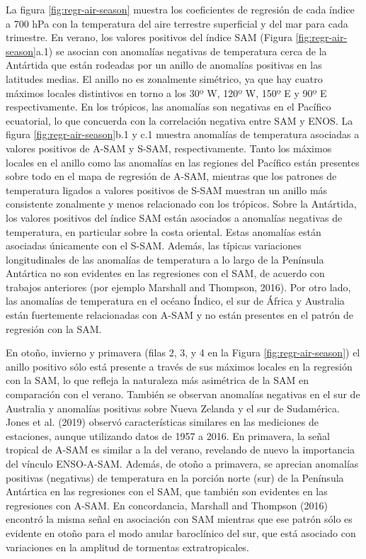 \documentclass[12pt,oneside]{reedthesis}
\begin{document}
La figura \ref{fig:regr-air-season} muestra los coeficientes de regresión de cada índice a 700 hPa con la temperatura del aire terrestre superficial y del mar para cada trimestre.
En verano, los valores positivos del índice SAM (Figura \ref{fig:regr-air-season}a.1) se asocian con anomalías negativas de temperatura cerca de la Antártida que están rodeadas por un anillo de anomalías positivas en las latitudes medias.
El anillo no es zonalmente simétrico, ya que hay cuatro máximos locales distintivos en torno a los 30º W, 120º W, 150º E y 90º E respectivamente.
En los trópicos, las anomalías son negativas en el Pacífico ecuatorial, lo que concuerda con la correlación negativa entre SAM y ENOS.
La figura \ref{fig:regr-air-season}b.1 y c.1 muestra anomalías de temperatura asociadas a valores positivos de A\nobreakdash-SAM y S\nobreakdash-SAM, respectivamente.
Tanto los máximos locales en el anillo como las anomalías en las regiones del Pacífico están presentes sobre todo en el mapa de regresión de A\nobreakdash-SAM, mientras que los patrones de temperatura ligados a valores positivos de S\nobreakdash-SAM muestran un anillo más consistente zonalmente y menos relacionado con los trópicos.
Sobre la Antártida, los valores positivos del índice SAM están asociados a anomalías negativas de temperatura, en particular sobre la costa oriental.
Estas anomalías están asociadas únicamente con el S\nobreakdash-SAM.
Además, las típicas variaciones longitudinales de las anomalías de temperatura a lo largo de la Península Antártica no son evidentes en las regresiones con el SAM, de acuerdo con trabajos anteriores (por ejemplo Marshall and Thompson, 2016).
Por otro lado, las anomalías de temperatura en el océano Índico, el sur de África y Australia están fuertemente relacionadas con A\nobreakdash-SAM y no están presentes en el patrón de regresión con la SAM.

En otoño, invierno y primavera (filas 2, 3, y 4 en la Figura \ref{fig:regr-air-season}) el anillo positivo sólo está presente a través de sus máximos locales en la regresión con la SAM, lo que refleja la naturaleza más asimétrica de la SAM en comparación con el verano.
También se observan anomalías negativas en el sur de Australia y anomalías positivas sobre Nueva Zelanda y el sur de Sudamérica.
Jones et al. (2019) observó características similares en las mediciones de estaciones, aunque utilizando datos de 1957 a 2016.
En primavera, la señal tropical de A\nobreakdash-SAM es similar a la del verano, revelando de nuevo la importancia del vínculo ENSO-A\nobreakdash-SAM.
Además, de otoño a primavera, se aprecian anomalías positivas (negativas) de temperatura en la porción norte (sur) de la Península Antártica en las regresiones con el SAM, que también son evidentes en las regresiones con A-SAM. En concordancia, Marshall and Thompson (2016) encontró la misma señal en asociación con SAM mientras que ese patrón sólo es evidente en otoño para el modo anular baroclínico del sur, que está asociado con variaciones en la amplitud de tormentas extratropicales.
\end{document}
